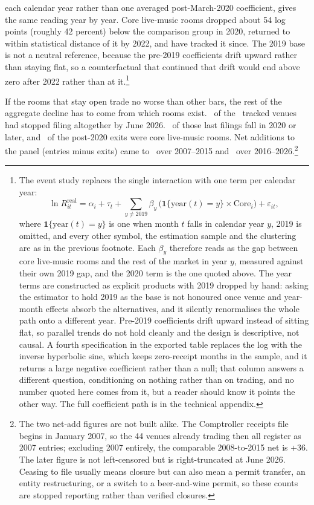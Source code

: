each calendar year rather than one averaged post-March-2020 coefficient, gives
the same reading year by year. Core live-music rooms dropped about 54 log
points (roughly 42 percent) below the comparison group in 2020, returned to
within statistical
distance of it by 2022, and have tracked it since. The 2019 base is not a
neutral reference, because the pre-2019 coefficients drift upward rather than
staying flat, so a counterfactual that continued that drift would end above
zero after 2022 rather than at it.\footnote{The event study replaces the
single interaction with one term per calendar year:
\[
\ln R^{\mathrm{real}}_{it}
  = \alpha_i + \tau_t
  + \sum_{y \neq 2019} \beta_y\,
    \bigl(\mathbf{1}\{\mathrm{year}(t) = y\} \times \mathrm{Core}_i\bigr)
  + \varepsilon_{it},
\]
where \(\mathbf{1}\{\mathrm{year}(t) = y\}\) is one when month \(t\) falls in
calendar year \(y\), 2019 is omitted, and every other symbol, the estimation
sample and the clustering are as in the previous footnote. Each \(\beta_y\)
therefore reads as the gap between core live-music rooms and the rest of the
market in year \(y\), measured against their own 2019 gap, and the 2020 term is
the one quoted above. The year terms are constructed as explicit products with
2019 dropped by hand: asking the estimator to hold 2019 as the base is not
honoured once venue and year-month effects absorb the alternatives, and it
silently renormalises the whole path onto a different year. Pre-2019
coefficients drift upward instead of sitting flat, so parallel trends do not
hold cleanly and the design is descriptive, not causal. A fourth specification
in the exported table replaces the log with the inverse hyperbolic sine, which
keeps zero-receipt months in the sample, and it returns a large negative
coefficient rather than a null; that column answers a different question,
conditioning on nothing rather than on trading, and no number quoted here comes
from it, but a reader should know it points the other way. The full
coefficient path is in the technical appendix.}

If the rooms that stay open trade no worse than other bars, the rest of the
aggregate decline has to come from which rooms exist. \NVenueExitsTotal\ of the
\NVenuePanelIsCurated\ tracked venues had stopped filing altogether by June
2026. \NVenueExitsTwoZeroTwoZeroTwoZeroTwoSix\ of those last filings fall in
2020 or later, and \NVenueExitsTwoZeroTwoZeroTwoZeroTwoSixCore\ of the post-2020
exits were core live-music rooms. Net additions to the panel (entries minus
exits) came to \NVenueNetAddsTwoZeroZeroSevenTwoZeroOneFive\ over 2007--2015 and
\NVenueNetAddsTwoZeroOneSixTwoZeroTwoSix\ over 2016--2026.\footnote{The two
net-add figures are not built alike. The Comptroller receipts file begins in
January 2007, so the 44 venues already trading then all register as 2007
entries; excluding 2007 entirely, the comparable 2008-to-2015 net is +36. The
later figure is not left-censored but is right-truncated at June 2026. Ceasing
to file usually means closure but can also mean a permit transfer, an entity
restructuring, or a switch to a beer-and-wine permit, so these counts are
stopped reporting rather than verified closures.}

